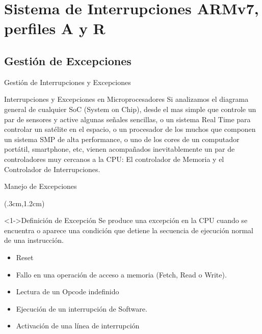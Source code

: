 \documentclass[table,x11names,aspectratio=169]{beamer}
\begin{document}
\section{Sistema de Interrupciones ARMv7, perfiles A y R}
\subsection{Gestión de Excepciones}
\begin{frame}{Gestión de Interrupciones y Excepciones}
 \begin{block}{Interrupciones y Excepciones en Microprocesadores} \justifying
  Si analizamos el diagrama general de cualquier SoC (System on Chip), desde el mas simple que controle un par de sensores y active algunas señales sencillas, o un sistema Real Time para controlar un satélite en el espacio, o un procesador de los muchos que componen un sistema SMP de alta performance, o uno de los cores de un computador portátil, smartphone, etc, vienen acompañados inevitablemente un par de controladores muy cercanos a la CPU: El controlador de Memoria y el Controlador de Interrupciones.
 \end{block}
\end{frame}

\begin{frame}{Manejo de Excepciones}
 \begin{textblock*}{\textwidth}(.3cm,1.2cm) 
  \begin{block}<1->{Definición de Excepción} \justifying
   Se produce una excepción en la CPU cuando se encuentra o aparece una condición que detiene la secuencia de ejecución normal de una instrucción.
  \end{block}
  \begin{itemize}[<+(2)->] \justifying
   \item Reset
   \item Fallo en una operación de acceso a memoria (Fetch, Read o Write).
   \item Lectura de un Opcode indefinido
   \item Ejecución de un interrupción de Software.
   \item Activación de una línea de interrupción
  \end{itemize}
\end{textblock*}
\end{frame}
\end{document}
